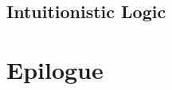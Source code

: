 \documentclass[11pt,titlepage]{report}
\numberwithin{equation}{subsection}
\renewcommand\subsection{\section}
\begin{document}
\subsection{Intuitionistic Logic}\label{intuitionism}




\chapter{Epilogue}\label{epilogue}

%
\end{document}
